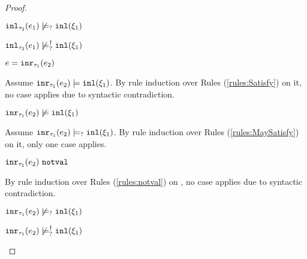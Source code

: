 \begin{proof}
\begin{byCases}
\begin{byCases}
\begin{byCases}
\begin{byCases}
            \end{byCases}
            \begin{pfsteps*}
            \item $\mathtt{inl}_{\tau_2}({e_1}) \not\models_{?} \mathtt{inl}(\xi_1)$  
            \item $\mathtt{inl}_{\tau_2}({e_1}) \not\models_{?}^{\dag} \mathtt{inl}(\xi_1)$ 
            \end{pfsteps*}
        \end{byCases}
    \item[\text{(\ref{rule:TInr})}]
        \begin{pfsteps*}
        \item $e=\mathtt{inr}_{\tau_1}({e_2})$ 
        \end{pfsteps*}
        Assume $\mathtt{inr}_{\tau_1}({e_2}) \models \mathtt{inl}(\xi_1)$. By rule induction over Rules (\ref{rules:Satisfy}) on it, no case applies due to syntactic contradiction.
        \begin{pfsteps*}
        \item $\mathtt{inr}_{\tau_1}({e_2}) \not\models \mathtt{inl}(\xi_1)$  
        \end{pfsteps*}
        Assume $\mathtt{inr}_{\tau_1}({e_2}) \models_{?} \mathtt{inl}(\xi_1)$. By rule induction over Rules (\ref{rules:MaySatisfy}) on it, only one case applies.
        \begin{byCases}
        \item[\text{(\ref{rule:CMSNotVal})}]
            \begin{pfsteps*}
            \item $\mathtt{inr}_{\tau_1}({e_2}) ~\mathtt{notval}$  
            \end{pfsteps*}
            By rule induction over Rules (\ref{rules:notval}) on , no case applies due to syntactic contradiction.
        \end{byCases}
        \begin{pfsteps*}
        \item $\mathtt{inr}_{\tau_1}({e_2}) \not\models_{?} \mathtt{inl}(\xi_1)$  
        \item $\mathtt{inr}_{\tau_1}({e_2}) \not\models_{?}^{\dag} \mathtt{inl}(\xi_1)$ 
        \end{pfsteps*}

\end{byCases}
\end{byCases}
\end{proof}
